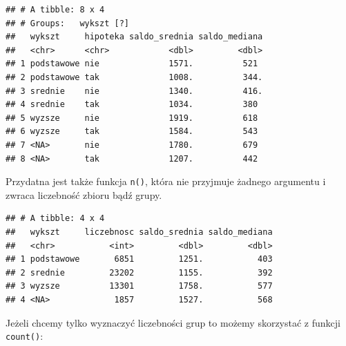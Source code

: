 \documentclass[]{book}
\newenvironment{Shaded}{\begin{snugshade}}{\end{snugshade}}
\newcommand{\KeywordTok}[1]{\textcolor[rgb]{0.13,0.29,0.53}{\textbf{#1}}}
\newcommand{\DataTypeTok}[1]{\textcolor[rgb]{0.13,0.29,0.53}{#1}}
\newcommand{\StringTok}[1]{\textcolor[rgb]{0.31,0.60,0.02}{#1}}
\newcommand{\OperatorTok}[1]{\textcolor[rgb]{0.81,0.36,0.00}{\textbf{#1}}}
\newcommand{\NormalTok}[1]{#1}
\begin{document}
\begin{verbatim}
## # A tibble: 8 x 4
## # Groups:   wykszt [?]
##   wykszt     hipoteka saldo_srednia saldo_mediana
##   <chr>      <chr>            <dbl>         <dbl>
## 1 podstawowe nie              1571.          521 
## 2 podstawowe tak              1008.          344.
## 3 srednie    nie              1340.          416.
## 4 srednie    tak              1034.          380 
## 5 wyzsze     nie              1919.          618 
## 6 wyzsze     tak              1584.          543 
## 7 <NA>       nie              1780.          679 
## 8 <NA>       tak              1207.          442
\end{verbatim}

Przydatna jest także funkcja \texttt{n()}, która nie przyjmuje żadnego
argumentu i zwraca liczebność zbioru bądź grupy.

\begin{Shaded}
\end{Shaded}

\begin{verbatim}
## # A tibble: 4 x 4
##   wykszt     liczebnosc saldo_srednia saldo_mediana
##   <chr>           <int>         <dbl>         <dbl>
## 1 podstawowe       6851         1251.           403
## 2 srednie         23202         1155.           392
## 3 wyzsze          13301         1758.           577
## 4 <NA>             1857         1527.           568
\end{verbatim}

Jeżeli chcemy tylko wyznaczyć liczebności grup to możemy skorzystać z
funkcji \texttt{count()}:

\begin{Shaded}
\end{Shaded}
\end{document}
